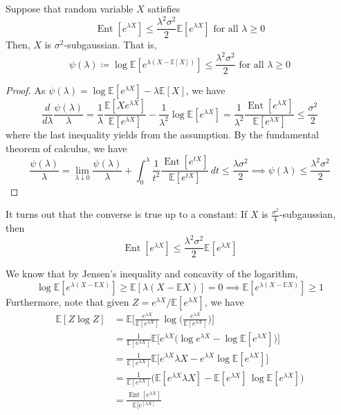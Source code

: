 \documentclass{article}
\DeclareMathOperator{\Ent}{Ent}
\begin{document}
\begin{lemma}[Herbst]
Suppose that random variable $X$ satisfies
\[\Ent[e^{\lambda X}] \leq \frac{\lambda^2 \sigma^2}{2} \mathbb{E}[e^{\lambda X}]  \text{ for all } \lambda \geq 0\]
Then, $X$ is $\sigma^2$-subgaussian. That is, 
\[\psi(\lambda) \coloneqq \log\mathbb{E}[e^{\lambda (X - \mathbb{E}[X])}] \leq \frac{\lambda^2 \sigma^2}{2} \text{ for all } \lambda \geq 0\]
\end{lemma}
\begin{proof}
As $\psi(\lambda) = \log\mathbb{E}[ e^{\lambda X}] - \lambda \mathbb{E}[X]$, we have 
\[\frac{d}{d \lambda} \frac{\psi(\lambda)}{\lambda} = \frac{1}{\lambda} \frac{\mathbb{E}[X e^{\lambda X}]}{\mathbb{E}[e^{\lambda X}]} - \frac{1}{\lambda^2} \log \mathbb{E}[e^{\lambda X}] = \frac{1}{\lambda^2} \frac{\Ent [e^{\lambda X}]}{\mathbb{E}[e^{\lambda X}]} \leq \frac{\sigma^2}{2}\]
where the last inequality yields from the assumption. By the fundamental theorem of calculus, we have 
\[\frac{\psi (\lambda)}{\lambda} = \lim_{\lambda \downarrow 0} \frac{\psi(\lambda)}{\lambda} + \int_0^\lambda \frac{1}{t^2} \frac{\Ent[e^{t X}]}{\mathbb{E}[e^{t X}]} \,dt \leq \frac{\lambda \sigma^2}{2} \implies \psi(\lambda) \leq \frac{\lambda^2 \sigma^2}{2}\]
\end{proof}

\begin{exercise}
It turns out that the converse is true up to a constant: If $X$ is $\frac{\sigma^2}{4}$-subgaussian, then 
\[\Ent [e^{\lambda X}] \leq \frac{\lambda^2 \sigma^2}{2} \mathbb{E}[e^{\lambda X}]\]
\end{exercise}
\begin{solution}
We know that by Jensen's inequality and concavity of the logarithm, 
\[\log \mathbb{E}[e^{\lambda(X - \mathbb{E} X)}] \geq \mathbb{E}[\lambda (X - \mathbb{E} X)] = 0 \implies \mathbb{E}[e^{\lambda(X - \mathbb{E} X)}] \geq 1\]
Furthermore, note that given $Z = e^{\lambda X} / \mathbb{E}[e^{\lambda X}]$, we have 
\begin{align*}
    \mathbb{E}[Z \log{Z}] & = \mathbb{E} \bigg[ \frac{e^{\lambda X}}{\mathbb{E}[e^{\lambda X}]} \, \log \bigg( \frac{e^{\lambda X}}{\mathbb{E}[e^{\lambda X}]} \bigg) \bigg] \\
    & = \frac{1}{\mathbb{E}[e^{\lambda X}]} \mathbb{E}\big[ e^{\lambda X} \big( \log e^{\lambda X} - \log \mathbb{E}[e^{\lambda X}] \big) \big] \\
    & = \frac{1}{\mathbb{E}[e^{\lambda X}]} \mathbb{E} \big[ e^{\lambda X} \lambda X - e^{\lambda X} \log \mathbb{E}[e^{\lambda X}] \big] \\
    & = \frac{1}{\mathbb{E}[e^{\lambda X}]} \Big( \mathbb{E} [ e^{\lambda X} \lambda X ] - \mathbb{E}[ e^{\lambda X}] \, \log \mathbb{E}[e^{\lambda X}] \Big) \\
    & = \frac{\Ent [e^{\lambda X}]}{\mathbb{E}[e^[{\lambda X}]} 
\end{align*}

\end{solution}
\end{document}
